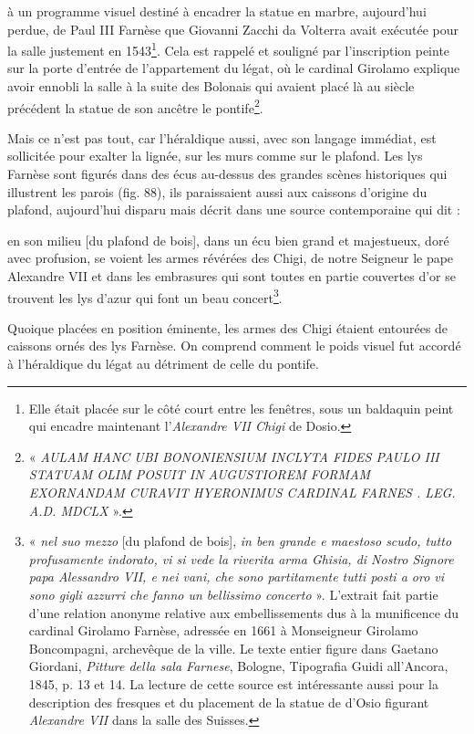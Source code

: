\documentclass[12pt,twoside,openany]{book}
\renewenvironment{quote}
  {%
    \par\begingroup
    \fontsize{11pt}{14pt}\selectfont
    \list{}{\leftmargin=1.5em\rightmargin=1.5em}%
    \item\relax
  }
  {%
    \endlist
    \endgroup
  }
\newenvironment{PurhBlockQuote}
  {%
    \begin{quote}
  }
  {%
    \end{quote}
  }
\begin{document}
à un programme visuel destiné à encadrer la statue en marbre, aujourd’hui perdue, de Paul III Farnèse que Giovanni Zacchi da Volterra avait exécutée pour la salle justement en 1543\footnote{Elle était placée sur le côté court entre les fenêtres, sous un baldaquin peint qui encadre maintenant l’\textit{Alexandre VII Chigi }de Dosio.}. Cela est rappelé et souligné par l’inscription peinte sur la porte d’entrée de l’appartement du légat, où le cardinal Girolamo explique avoir ennobli la salle à la suite des Bolonais qui avaient placé là au siècle précédent la statue de son ancêtre le pontife\footnote{« \textit{AULAM HANC UBI BONONIENSIUM INCLYTA FIDES PAULO III STATUAM OLIM POSUIT IN AUGUSTIOREM FORMAM EXORNANDAM CURAVIT HYERONIMUS CARDINAL FARNES . LEG. A.D. MDCLX} ».}.

Mais ce n’est pas tout, car l’héraldique aussi, avec son langage immédiat, est sollicitée pour exalter la lignée, sur les murs comme sur le plafond. Les lys Farnèse sont figurés dans des écus au-dessus des grandes scènes historiques qui illustrent les parois (fig. 88), ils paraissaient aussi aux caissons d’origine du plafond, aujourd’hui disparu mais décrit dans une source contemporaine qui dit :

\begin{PurhBlockQuote}
en son milieu [du plafond de bois], dans un écu bien grand et majestueux, doré avec profusion, se voient les armes révérées des Chigi, de notre Seigneur le pape Alexandre VII et dans les embrasures qui sont toutes en partie couvertes d’or se trouvent les lys d’azur qui font un beau concert\footnote{« \textit{nel suo mezzo} [du plafond de bois], \textit{in ben grande e maestoso scudo, tutto profusamente indorato, vi si vede la riverita arma Ghisia, di Nostro Signore papa Alessandro VII, e nei vani, che sono partitamente tutti posti a oro vi sono gigli azzurri che fanno un bellissimo concerto} ». L’extrait fait partie d’une relation anonyme relative aux embellissements dus à la munificence du cardinal Girolamo Farnèse, adressée en 1661 à Monseigneur Girolamo Boncompagni, archevêque de la ville. Le texte entier figure dans Gaetano Giordani, \textit{Pitture della sala Farnese}, Bologne, Tipografia Guidi all’Ancora, 1845, p. 13 et 14. La lecture de cette source est intéressante aussi pour la description des fresques et du placement de la statue de d’Osio figurant \textit{Alexandre VII }dans la salle des Suisses.}.
\end{PurhBlockQuote}

Quoique placées en position éminente, les armes des Chigi étaient entourées de caissons ornés des lys Farnèse. On comprend comment le poids visuel fut accordé à l’héraldique du légat au détriment de celle du pontife.
\end{document}
